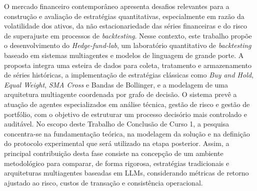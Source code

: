 \documentclass{eic-bcc-tcc}
\begin{document}
\begin{resumo}
O mercado financeiro contemporâneo apresenta desafios relevantes para a construção e avaliação de estratégias quantitativas, especialmente em razão da volatilidade dos ativos, da não estacionariedade das séries financeiras e do risco de superajuste em processos de \textit{backtesting}. Nesse contexto, este trabalho propõe o desenvolvimento do \textit{Hedge-fund-lab}, um laboratório quantitativo de \textit{backtesting} baseado em sistemas multiagentes e modelos de linguagem de grande porte. A proposta integra uma esteira de dados para coleta, tratamento e armazenamento de séries históricas, a implementação de estratégias clássicas como \textit{Buy and Hold}, \textit{Equal Weight}, \textit{SMA Cross} e Bandas de Bollinger, e a modelagem de uma arquitetura multiagente coordenada por grafo de decisão. O sistema prevê a atuação de agentes especializados em análise técnica, gestão de risco e gestão de portfólio, com o objetivo de estruturar um processo decisório mais controlado e auditável. No escopo deste Trabalho de Conclusão de Curso 1, a pesquisa concentra-se na fundamentação teórica, na modelagem da solução e na definição do protocolo experimental que será utilizado na etapa posterior. Assim, a principal contribuição desta fase consiste na concepção de um ambiente metodológico para comparar, de forma rigorosa, estratégias tradicionais e arquiteturas multiagentes baseadas em LLMs, considerando métricas de retorno ajustado ao risco, custos de transação e consistência operacional.

\end{resumo}
\end{document}
